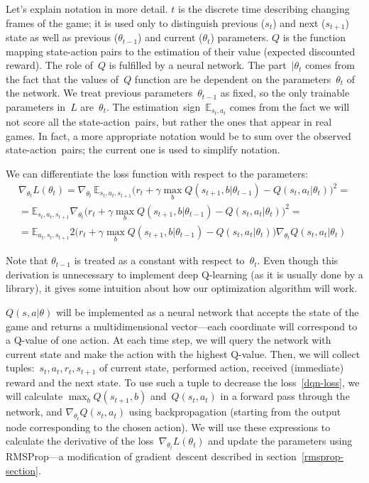Let's explain notation in more detail. $t$ is the discrete time describing changing frames of the game; it is used only to distinguish previous ($s_t$) and next ($s_{t+1}$) state as well as previous ($\theta_{t-1}$) and current ($\theta_t$) parameters. $Q$ is the function mapping state-action pairs to the estimation of their value (expected discounted reward). The role of~$Q$ is fulfilled by a neural network. The part~$|\theta_t$ comes from the fact that the values of~$Q$ function are be dependent on the parameters~$\theta_t$ of the network. We treat previous parameters~$\theta_{t-1}$ as fixed, so the only trainable parameters in~$L$ are~$\theta_t$. The estimation~sign~$\mathbb{E}_{s_t, a_t}$ comes from the fact we will not score all the state-action~pairs, but rather the ones that appear in real games. In fact, a more appropriate notation would be to sum over the observed state-action~pairs; the current one is used to simplify notation.

We can differentiate the loss function with respect to the parameters:
\begin{multline}
  \nabla_{\theta_t} L(\theta_t) = \nabla_{\theta_t}\, \mathbb{E}_{s_t, a_t, s_{t+1}} \big(r_t + \gamma \max_b Q(s_{t+1}, b|\theta_{t-1}) - Q(s_t, a_t|\theta_t)\big)^2
 =\\=
  \mathbb{E}_{s_t, a_t, s_{t+1}} \nabla_{\theta_t} \big(r_t + \gamma \max_b Q(s_{t+1}, b|\theta_{t-1}) - Q(s_t, a_t|\theta_t)\big)^2
  =\\=
  \mathbb{E}_{a_t,s_t, s_{t+1}} 2\Big(
  r_t + \gamma \max_b Q(s_{t+1}, b|\theta_{t-1}) - Q(s_t, a_t|\theta_t)\Big)
  \nabla_{\theta_t} Q(s_t, a_t|\theta_t)
\end{multline}

Note that $\theta_{t-1}$ is treated as a constant with respect to~$\theta_t$. Even though this derivation is unnecessary to implement deep Q-learning (as it is usually done by a library), it gives some intuition about how our optimization algorithm will work.

$Q(s, a|\theta)$ will be implemented as a neural network that accepts the state of the game and returns a multidimensional vector---each coordinate will correspond to a Q-value of one action. At each time step, we will query the network with current state and make the action with the highest Q-value.
Then, we will collect tuples:~$s_t, a_t, r_t, s_{t+1}$ of current state, performed action, received (immediate) reward and the next state. To use such a tuple to decrease the loss~\eqref{dqn-loss}, we will calculate $\max_b Q(s_{t+1}, b)$ and~$Q(s_t, a_t)$ in a forward pass through the network, and $\nabla_{\theta_t} Q(s_t, a_t)$ using backpropagation (starting from the output node corresponding to the chosen action). We will use these expressions to calculate the derivative of the loss~$\nabla_{\theta_t} L(\theta_t)$ and update the parameters using RMSProp---a modification of gradient~descent described in section~\ref{rmsprop-section}.

